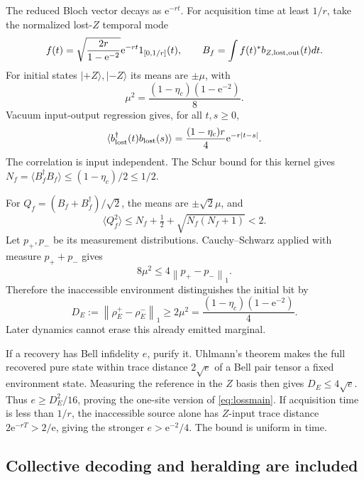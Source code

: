 \documentclass[11pt,a4paper]{article}
\newcommand{\norm}[1]{\left\lVert #1\right\rVert}\newcommand{\ket}[1]{\lvert #1\rangle}\newcommand{\bra}[1]{\langle #1\rvert}
\newcommand{\ee}{\mathrm e}
\begin{document}
The reduced Bloch vector decays as $\ee^{-rt}$. For acquisition time at least $1/r$, take the normalized lost-$Z$ temporal mode
\begin{equation}
 f(t)=\sqrt{\frac{2r}{1-\ee^{-2}}}\ee^{-rt}1_{[0,1/r]}(t),\qquad
 B_f=\int f(t)^*b_{Z,\rm lost,out}(t)dt.
\end{equation}
For initial states $\ket{+Z},\ket{-Z}$ its means are $\pm\mu$, with
\begin{equation}
 \mu^2=\frac{(1-\eta_c)(1-\ee^{-2})}{8}.
\end{equation}
Vacuum input-output regression gives, for all $t,s\ge0$,
\begin{equation}
 \langle b_{\rm lost}^\dagger(t)b_{\rm lost}(s)\rangle
 =\frac{(1-\eta_c)r}{4}\ee^{-r|t-s|}.
\end{equation}
The correlation is input independent. The Schur bound for this kernel gives $N_f=\langle B_f^\dagger B_f\rangle\le(1-\eta_c)/2\le1/2$.

For $Q_f=(B_f+B_f^\dagger)/\sqrt2$, the means are $\pm\sqrt2\mu$, and
\begin{equation}
 \langle Q_f^2\rangle\le N_f+\tfrac12+\sqrt{N_f(N_f+1)}<2.
\end{equation}
Let $p_+,p_-$ be its measurement distributions. Cauchy--Schwarz applied with measure $p_++p_-$ gives
\begin{equation}
 8\mu^2\le4\norm{p_+-p_-}_1.
\end{equation}
Therefore the inaccessible environment distinguishes the initial bit by
\begin{equation}
 D_E:=\norm{\rho_E^+-\rho_E^-}_1
 \ge2\mu^2=\frac{(1-\eta_c)(1-\ee^{-2})}{4}.
 \label{eq:envdist}
\end{equation}
Later dynamics cannot erase this already emitted marginal.

If a recovery has Bell infidelity $e$, purify it. Uhlmann's theorem makes the full recovered pure state within trace distance $2\sqrt e$ of a Bell pair tensor a fixed environment state. Measuring the reference in the $Z$ basis then gives $D_E\le4\sqrt e$. Thus $e\ge D_E^2/16$, proving the one-site version of \eqref{eq:lossmain}. If acquisition time is less than $1/r$, the inaccessible source alone has $Z$-input trace distance $2\ee^{-rT}>2/\ee$, giving the stronger $e>\ee^{-2}/4$. The bound is uniform in time.

\subsection{Collective decoding and heralding are included}
\end{document}
